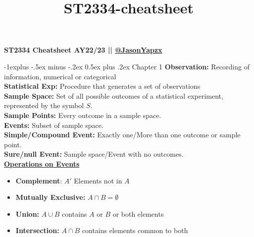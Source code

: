 \documentclass[10pt,landscape]{article}
\title{ST2334-cheatsheet}
\makeatletter
\renewcommand{\subsection}{\@startsection{subsection}{2}{0mm}%
                                {-1explus -.5ex minus -.2ex}%
                                {0.5ex plus .2ex}%
                                {\normalfont\normalsize\bfseries}}
\makeatother
\begin{document}
\raggedright
\scriptsize


\begin{multicols*}{3}
\setlength{\premulticols}{0.1pt}
\setlength{\postmulticols}{0.1pt}
\setlength{\multicolsep}{0.1pt}
\setlength{\columnsep}{0.1pt}
\begin{tiny}
    \small{\textbf{ST2334 Cheatsheet AY22/23 || \href{https://github.com/JasonYapzx}{@JasonYapzx}}} \\
\end{tiny}
\subsection{Chapter 1}
\textbf{Observation:} Recording of information, numerical or categorical \\ 
\textbf{Statistical Exp:} Procedure that generates a set of observations \\ 
\textbf{Sample Space:} Set of all possible outcomes of a statistical experiment, represented by the symbol $S$. \\
\textbf{Sample Points:} Every outcome in a sample space. \\ 
\textbf{Events:} Subset of sample space. \\ 
\textbf{Simple/Compound Event:} Exactly one/More than one outcome or sample point. \\ 
\textbf{Sure/null Event:} Sample space/Event with no outcomes. \\

\textbf{\underline{Operations on Events}} \\ 
\begin{itemize}[topsep=0pt,noitemsep,wide=0pt, leftmargin=\dimexpr{} + 2\relax]
    \item \textbf{Complement}: $A'$ Elements not in $A$
    \item \textbf{Mutually Exclusive:} $A \cap B = \emptyset$ 
    \item \textbf{Union:} $A \cup B$ contains $A$ or $B$ or both elements
    \item \textbf{Intersection:} $A \cap B$ contains elements common to both
\end{itemize}


\end{multicols*}
\end{document}
